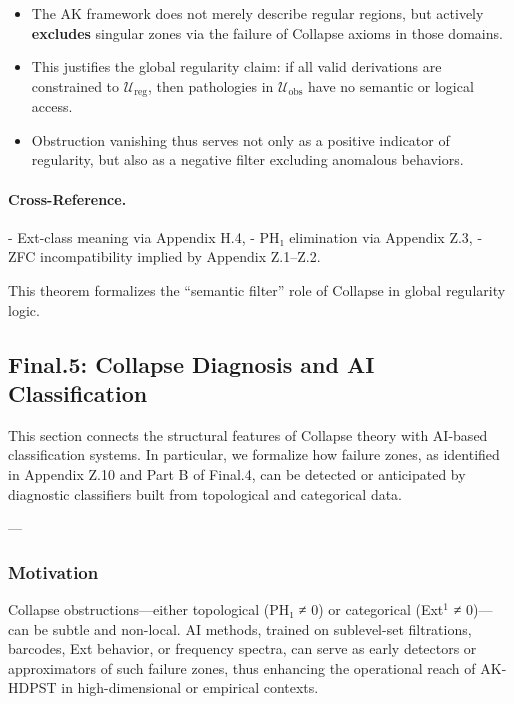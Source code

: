 \documentclass[11pt]{article}
\begin{document}
\begin{axiom}
\begin{axiom}
{{\begin{itemize}
  \item The AK framework does not merely describe regular regions, but actively \textbf{excludes}  
  singular zones via the failure of Collapse axioms in those domains.
  \item This justifies the global regularity claim:  
  if all valid derivations are constrained to \( \mathcal{U}_{\text{reg}} \),  
  then pathologies in \( \mathcal{U}_{\text{obs}} \) have no semantic or logical access.
  \item Obstruction vanishing thus serves not only as a positive indicator of regularity,  
  but also as a negative filter excluding anomalous behaviors.
\end{itemize}

\paragraph{Cross-Reference.}

- Ext-class meaning via Appendix H.4,  
- PH₁ elimination via Appendix Z.3,  
- ZFC incompatibility implied by Appendix Z.1–Z.2.

This theorem formalizes the “semantic filter” role of Collapse in global regularity logic.



\subsection*{Final.5: Collapse Diagnosis and AI Classification}

This section connects the structural features of Collapse theory with AI-based classification systems.  
In particular, we formalize how failure zones, as identified in Appendix Z.10 and Part B of Final.4,  
can be detected or anticipated by diagnostic classifiers built from topological and categorical data.

---

\subsubsection*{Motivation}

Collapse obstructions—either topological (PH₁ ≠ 0) or categorical (Ext$^1$ ≠ 0)—can be subtle and non-local.  
AI methods, trained on sublevel-set filtrations, barcodes, Ext behavior, or frequency spectra,  
can serve as early detectors or approximators of such failure zones,  
thus enhancing the operational reach of AK-HDPST in high-dimensional or empirical contexts.

}}
\end{axiom}
\end{axiom}
\end{document}
